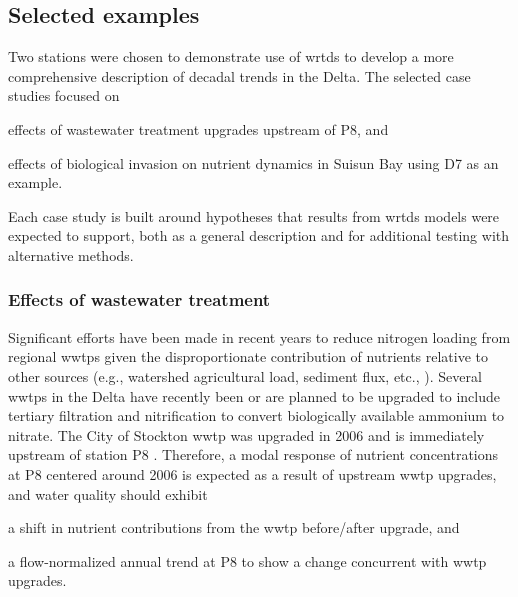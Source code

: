 \documentclass[journal = esthag, manuscript = article]{achemso}\usepackage[]{graphicx}\usepackage[]{color}
\begin{document}
\subsection{Selected examples}

Two stations were chosen to demonstrate use of \ac{wrtds} to develop a more comprehensive description of decadal trends in the Delta.  The selected case studies focused on \begin{inparaenum}[1\upshape)]
\item effects of wastewater treatment upgrades upstream of P8, and
\item effects of biological invasion on nutrient dynamics in Suisun Bay using D7 as an example.
\end{inparaenum}
Each case study is built around hypotheses that results from \ac{wrtds} models were expected to support, both as a general description and for additional testing with alternative methods. 

\subsubsection{Effects of wastewater treatment}

Significant efforts have been made in recent years to reduce nitrogen loading from regional \acp{wwtp} given the disproportionate contribution of nutrients relative to other sources (e.g., watershed agricultural load, sediment flux, etc., )\cite{Cornwell14,Novick15}.  Several \acp{wwtp} in the Delta have recently been or are planned to be upgraded to include tertiary filtration and nitrification to convert biologically available ammonium to nitrate. The City of Stockton \ac{wwtp} was upgraded in 2006 and is immediately upstream of station P8 \cite{Jabusch16}. Therefore, a modal response of nutrient concentrations at P8 centered around 2006 is expected as a result of upstream \ac{wwtp} upgrades, and water quality should exhibit \begin{inparaenum}[1\upshape)]
\item a shift in nutrient contributions from the \ac{wwtp} before/after upgrade, and
\item a flow-normalized annual trend at P8 to show a change concurrent with \ac{wwtp} upgrades.
\end{inparaenum}
\end{document}
